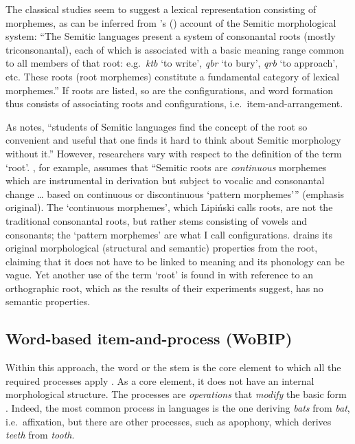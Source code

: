 \documentclass[output=paper,
modfonts
]{LSP/langsci}
\begin{document}
	The classical studies seem to suggest a lexical representation
consisting of morphemes, as can be inferred from \citeauthor{moscati1980a}'s (\citeyear[71]{moscati1980a}) account
of the Semitic morphological system: ``The Semitic languages present a
system of consonantal roots (mostly triconsonantal), each of which is
associated with a basic meaning range common to all members of that
root: e.g.\ \emph{ktb} `to write', \emph{qbr} `to bury', \emph{qrb} `to
approach', etc. These roots (root morphemes) constitute a fundamental
category of lexical morphemes.'' If roots are listed, so are the
	configurations, and word formation thus consists of associating roots
	and configurations, i.e.\ item-and-arrangement.
	
As \citet[139]{hoberman2006a} notes, ``students of Semitic languages find the
concept of the root so convenient and useful that one finds it hard to
think about Semitic morphology without it.'' However,
	researchers vary with respect to the definition of the term `root'.
\citet[202]{lipinski1997a}, for example, assumes that ``Semitic roots are
\emph{continuous} morphemes which are instrumental in derivation but
subject to vocalic and consonantal change \ldots{} based on continuous
or discontinuous `pattern morphemes''' (emphasis original). The
`continuous morphemes', which Lipiński calls roots, are not the
traditional consonantal roots, but rather stems consisting of vowels and
consonants; the `pattern morphemes' are what I call configurations.
\citet{aronoff2007a} drains its original morphological
(structural and semantic) properties from the root, claiming that it does not have to
be linked to meaning and its phonology can be vague. Yet another use of
the term `root' is found in \citet{Frost1997} with reference to an
orthographic root, which as the results of their experiments suggest,
has no semantic properties.
	
	\subsection{Word-based item-and-process (WoBIP)}\label{word-based-item-and-process-wobip}
	
	Within this approach, the word or the stem is the core element to which
	all the required processes apply \citep{aronoff1976}. As a core element, it
	does not have an internal morphological structure. The processes are
	\emph{operations} \citep[72]{anderson1992} that \emph{modify} the basic form
\citep[97]{Matthews1974}. Indeed, the most common process in languages is the
one deriving \emph{bats} from \emph{bat}, i.e.\ affixation, but there are
other processes, such as apophony, which derives \emph{teeth} from
\emph{tooth}.
	
\end{document}
